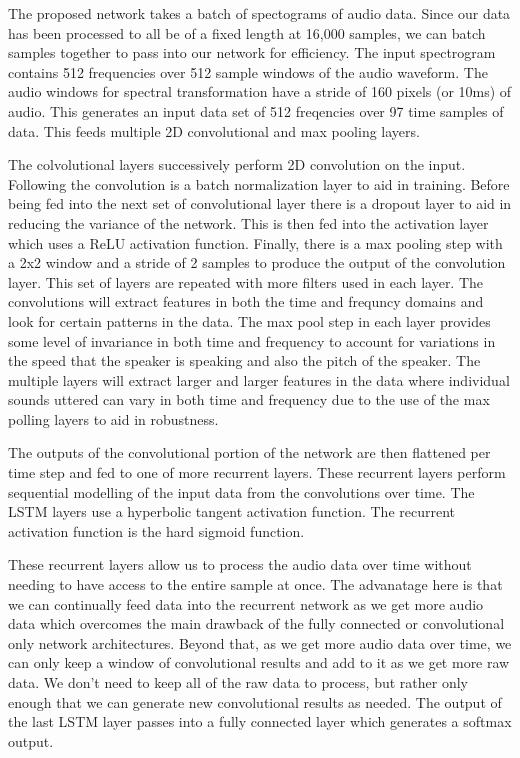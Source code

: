 \documentclass{article}
\begin{document}
The proposed network takes a batch of spectograms of audio data. Since
our data has been processed to all be of a fixed length at 16,000
samples, we can batch samples together to pass into our network for
efficiency. The input spectrogram contains 512 frequencies over 512
sample windows of the audio waveform. The audio windows for spectral
transformation have a stride of 160 pixels (or 10ms) of audio. This
generates an input data set of 512 freqencies over 97 time samples of
data. This feeds multiple 2D convolutional and max pooling layers.

The colvolutional layers successively perform 2D convolution on the
input. Following the convolution is a batch normalization layer to aid
in training. Before being fed into the next set of convolutional layer
there is a dropout layer to aid in reducing the variance of the
network. This is then fed into the activation layer which uses a
ReLU activation function. Finally, there is a max pooling step with a
2x2 window and a stride of 2 samples to produce the output of the
convolution layer. This set of layers are repeated with more filters
used in each layer. The convolutions will extract features in both the
time and frequncy domains and look for certain patterns in the
data. The max pool step in each layer provides some level of
invariance in both time and frequency to account for variations in the
speed that the speaker is speaking and also the pitch of the
speaker. The multiple layers will extract larger and larger features
in the data where individual sounds uttered can vary in both time and
frequency due to the use of the max polling layers to aid in
robustness.

The outputs of the convolutional portion of the network are then
flattened per time step and fed to one of more recurrent layers. These
recurrent layers perform sequential modelling of the input data from
the convolutions over time. The LSTM layers use a hyperbolic tangent
activation function. The recurrent activation function is the hard
sigmoid function.

These recurrent layers allow us to process
the audio data over time without needing to have access to the entire
sample at once. The advanatage here is that we can continually feed
data into the recurrent network as we get more audio data which
overcomes the main drawback of the fully connected or convolutional
only network architectures. Beyond that, as we get more audio data
over time, we can only keep a window of convolutional results and add
to it as we get more raw data. We don't need to keep all of the raw
data to process, but rather only enough that we can generate new
convolutional results as needed. The output of the last LSTM layer
passes into a fully connected layer which generates a softmax output.
\end{document}
